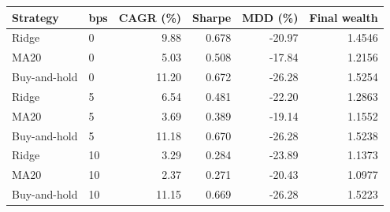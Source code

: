 \begin{tabular}{llrrrr}
\toprule
Strategy & bps & CAGR (\%) & Sharpe & MDD (\%) & Final wealth \\
\midrule
Ridge & 0 & 9.88 & 0.678 & -20.97 & 1.4546 \\
MA20 & 0 & 5.03 & 0.508 & -17.84 & 1.2156 \\
Buy-and-hold & 0 & 11.20 & 0.672 & -26.28 & 1.5254 \\
Ridge & 5 & 6.54 & 0.481 & -22.20 & 1.2863 \\
MA20 & 5 & 3.69 & 0.389 & -19.14 & 1.1552 \\
Buy-and-hold & 5 & 11.18 & 0.670 & -26.28 & 1.5238 \\
Ridge & 10 & 3.29 & 0.284 & -23.89 & 1.1373 \\
MA20 & 10 & 2.37 & 0.271 & -20.43 & 1.0977 \\
Buy-and-hold & 10 & 11.15 & 0.669 & -26.28 & 1.5223 \\
\bottomrule
\end{tabular}
